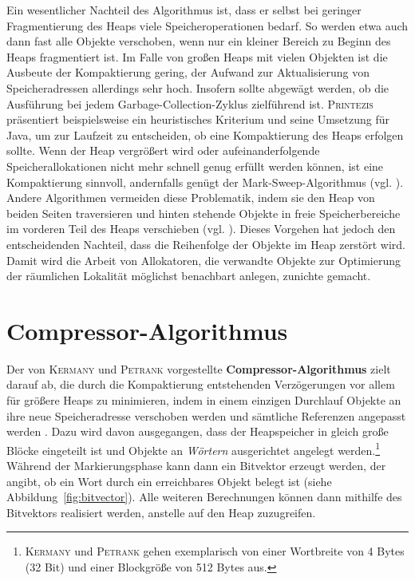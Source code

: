 Ein wesentlicher Nachteil des Algorithmus ist, dass er selbst bei geringer Fragmentierung des Heaps viele Speicheroperationen bedarf.
So werden etwa auch dann fast alle Objekte verschoben, wenn nur ein kleiner Bereich zu Beginn des Heaps fragmentiert ist.
Im Falle von großen Heaps mit vielen Objekten ist die Ausbeute der Kompaktierung gering, der Aufwand zur Aktualisierung von Speicheradressen allerdings sehr hoch.
Insofern sollte abgewägt werden, ob die Ausführung bei jedem Garbage-Collection-Zyklus zielführend ist.
\textsc{Printezis} präsentiert beispielsweise ein heuristisches Kriterium und seine Umsetzung für Java, um zur Laufzeit zu entscheiden, ob eine Kompaktierung des Heaps erfolgen sollte.
Wenn der Heap vergrößert wird oder aufeinanderfolgende Speicherallokationen nicht mehr schnell genug erfüllt werden können, ist eine Kompaktierung sinnvoll, andernfalls genügt der Mark-Sweep-Algorithmus (vgl. \cite[Kap. 3.4]{printezis2001}).
Andere Algorithmen vermeiden diese Problematik, indem sie den Heap von beiden Seiten traversieren und hinten stehende Objekte in freie Speicherbereiche im vorderen Teil des Heaps verschieben (vgl. \cite[S. 32f]{handbook}).
Dieses Vorgehen hat jedoch den entscheidenden Nachteil, dass die Reihenfolge der Objekte im Heap zerstört wird.
Damit wird die Arbeit von Allokatoren, die verwandte Objekte zur Optimierung der räumlichen Lokalität möglichst benachbart anlegen, zunichte gemacht.




\section{Compressor-Algorithmus}
\label{sec:compressor}

Der von \textsc{Kermany} und \textsc{Petrank} vorgestellte \textbf{Compressor-Algorithmus} zielt darauf ab, die durch die Kompaktierung entstehenden Verzögerungen vor allem für größere Heaps zu minimieren, indem in einem einzigen Durchlauf Objekte an ihre neue Speicheradresse verschoben werden und sämtliche Referenzen angepasst werden \cite{kermany2006}.
Dazu wird davon ausgegangen, dass der Heapspeicher in gleich große Blöcke eingeteilt ist und Objekte an \textit{Wörtern} ausgerichtet angelegt werden.\footnote{\textsc{Kermany} und \textsc{Petrank} gehen exemplarisch von einer Wortbreite von 4 Bytes (32 Bit) und einer Blockgröße von 512 Bytes aus.}
Während der Markierungsphase kann dann ein Bitvektor erzeugt werden, der angibt, ob ein Wort durch ein erreichbares Objekt belegt ist (siehe Abbildung~\ref{fig:bitvector}).
Alle weiteren Berechnungen können dann mithilfe des Bitvektors realisiert werden, anstelle auf den Heap zuzugreifen.

